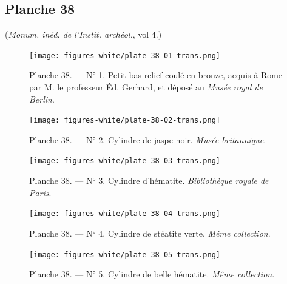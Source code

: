 \documentclass[a4paper, 11pt, oneside, polutonikogreek, french]{article}
\begin{document}
\subsection{Planche 38}
\begin{center}
(\emph{Monum. inéd. de l'Instit. archéol.}, vol 4.)
\end{center}
\vspace*{\fill}
\clearpage
\pagestyle{fancy}
\fancyhf{}
\cfoot{{\tiny\bfseries\thepage}}
\vspace*{\fill}
\begin{figure}[H]
\centering
\texttt{[image: figures-white/plate-38-01-trans.png]}
\caption{\scriptsize Planche 38. --- N° 1. Petit bas-relief coulé en bronze, acquis à Rome par M. le professeur Éd. Gerhard, et déposé au \emph{Musée royal de Berlin}.}
\end{figure}
\vspace*{\fill}
\clearpage
\vspace*{\fill}
\begin{figure}[H]
\centering
\texttt{[image: figures-white/plate-38-02-trans.png]}
\caption{\scriptsize Planche 38. --- N° 2. Cylindre de jaspe noir. \emph{Musée britannique}.}
\end{figure}
\vspace*{\fill}
\clearpage
\vspace*{\fill}
\begin{figure}[H]
\centering
\texttt{[image: figures-white/plate-38-03-trans.png]}
\caption{\scriptsize Planche 38. --- N° 3. Cylindre d'hématite. \emph{Bibliothèque royale de Paris}.}
\end{figure}
\vspace*{\fill}
\clearpage
\vspace*{\fill}
\begin{figure}[H]
\centering
\texttt{[image: figures-white/plate-38-04-trans.png]}
\caption{\scriptsize Planche 38. --- N° 4. Cylindre de stéatite verte. \emph{Même collection}.}
\end{figure}
\vspace*{\fill}
\clearpage
\vspace*{\fill}
\begin{figure}[H]
\centering
\texttt{[image: figures-white/plate-38-05-trans.png]}
\caption{\scriptsize Planche 38. --- N° 5. Cylindre de belle hématite. \emph{Même collection}.}
\end{figure}
\vspace*{\fill}
\clearpage
\vspace*{\fill}
\end{document}
